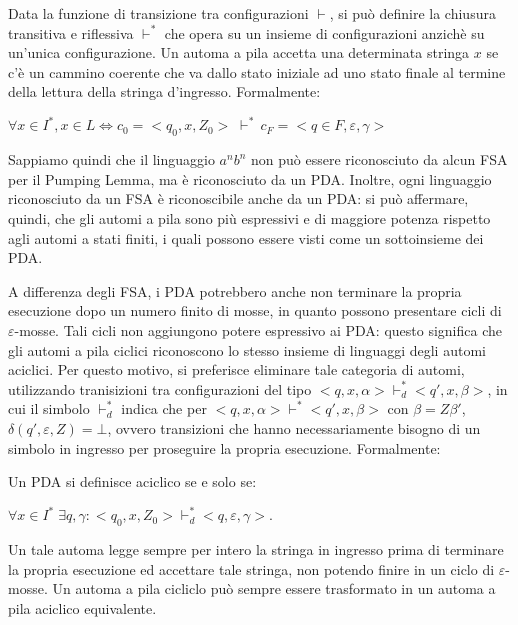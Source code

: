   Data la funzione di transizione tra configurazioni \(\vdash\), si può definire la chiusura transitiva e riflessiva \(\vdash^*\) che opera su un insieme di configurazioni anzichè su un'unica configurazione. Un automa a pila accetta una determinata stringa \(x\) se c’è un cammino coerente che va dallo stato iniziale ad uno stato finale al termine della lettura della stringa d’ingresso. Formalmente:

  \begin{math}
    \forall x \in I^*, x \in L \Leftrightarrow c_0=<q_0,x, Z_0>\;\vdash^*\,c_F=<q\in F, \varepsilon, \gamma>
  \end{math}

  \vspace{10pt}

  Sappiamo quindi che il linguaggio \(a^nb^n\) non può essere riconosciuto da alcun FSA per il Pumping Lemma, ma è riconosciuto da un PDA. Inoltre, ogni linguaggio riconosciuto da un FSA è riconoscibile anche da un PDA: si può affermare, quindi, che gli automi a pila sono più espressivi e di maggiore potenza rispetto agli automi a stati finiti, i quali possono essere visti come un sottoinsieme dei PDA. 

  A differenza degli FSA, i PDA potrebbero anche non terminare la propria esecuzione dopo un numero finito di mosse, in quanto possono presentare cicli di \(\varepsilon\)-mosse. Tali cicli non aggiungono potere espressivo ai PDA: questo significa che gli automi a pila ciclici riconoscono lo stesso insieme di linguaggi degli automi aciclici. Per questo motivo, si preferisce eliminare tale categoria di automi, utilizzando tranisizioni tra configurazioni del tipo \(<q,x,\alpha>\vdash^*_d<q',x,\beta>\), in cui il simbolo \(\vdash_d^*\) indica che per \(<q,x,\alpha>\vdash^*<q',x,\beta>\) con \(\beta = Z\beta'\), \(\delta(q', \varepsilon, Z) = \bot\), ovvero transizioni che hanno necessariamente bisogno di un simbolo in ingresso per proseguire la propria esecuzione. Formalmente:

  \begin{definition}
    Un PDA si definisce aciclico se e solo se:

    \begin{math}
      \forall x \in I^*\; \exists q,\gamma : <q_0, x, Z_0> \vdash_d^* <q, \varepsilon, \gamma>.
    \end{math}
  \end{definition}

  Un tale automa legge sempre per intero la stringa in ingresso prima di terminare la propria esecuzione ed accettare tale stringa, non potendo finire in un ciclo di \(\varepsilon\)-mosse. Un automa a pila cicliclo può sempre essere trasformato in un automa a pila aciclico equivalente.

